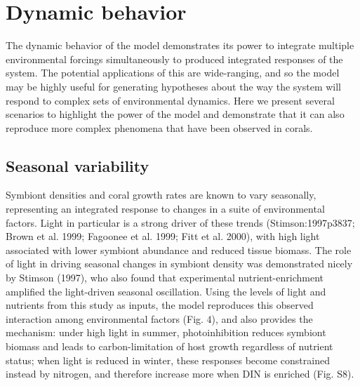 \documentclass[]{elsarticle} %
\begin{document}
\section{Dynamic behavior}\label{dynamic-behavior}

The dynamic behavior of the model demonstrates its power to integrate
multiple environmental forcings simultaneously to produced integrated
responses of the system. The potential applications of this are
wide-ranging, and so the model may be highly useful for generating
hypotheses about the way the system will respond to complex sets of
environmental dynamics. Here we present several scenarios to highlight
the power of the model and demonstrate that it can also reproduce more
complex phenomena that have been observed in corals.

\subsection{Seasonal variability}\label{seasonal-variability}

Symbiont densities and coral growth rates are known to vary seasonally,
representing an integrated response to changes in a suite of
environmental factors. Light in particular is a strong driver of these
trends (Stimson:1997p3837; Brown et al. 1999; Fagoonee et al. 1999; Fitt
et al. 2000), with high light associated with lower symbiont abundance
and reduced tissue biomass. The role of light in driving seasonal
changes in symbiont density was demonstrated nicely by Stimson (1997),
who also found that experimental nutrient-enrichment amplified the
light-driven seasonal oscillation. Using the levels of light and
nutrients from this study as inputs, the model reproduces this observed
interaction among environmental factors (Fig. 4), and also provides the
mechanism: under high light in summer, photoinhibition reduces symbiont
biomass and leads to carbon-limitation of host growth regardless of
nutrient status; when light is reduced in winter, these responses become
constrained instead by nitrogen, and therefore increase more when DIN is
enriched (Fig. S8).
\end{document}
